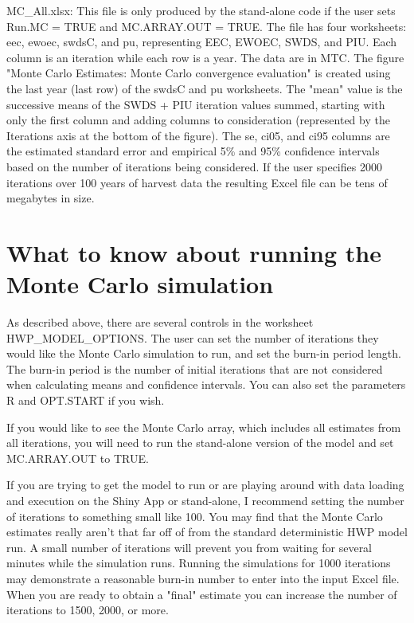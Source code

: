 \documentclass[
]{book}
\begin{document}
MC\_All.xlsx: This file is only produced by the stand-alone code if the user sets Run.MC = TRUE and MC.ARRAY.OUT = TRUE. The file has four worksheets: eec, ewoec, swdsC, and pu, representing EEC, EWOEC, SWDS, and PIU. Each column is an iteration while each row is a year. The data are in MTC. The figure "Monte Carlo Estimates: Monte Carlo convergence evaluation" is created using the last year (last row) of the swdsC and pu worksheets. The "mean" value is the successive means of the SWDS + PIU iteration values summed, starting with only the first column and adding columns to consideration (represented by the Iterations axis at the bottom of the figure). The se, ci05, and ci95 columns are the estimated standard error and empirical 5\% and 95\% confidence intervals based on the number of iterations being considered. If the user specifies 2000 iterations over 100 years of harvest data the resulting Excel file can be tens of megabytes in size.

\hypertarget{own-mc}{%
\section{What to know about running the Monte Carlo simulation}\label{own-mc}}

As described above, there are several controls in the worksheet HWP\_MODEL\_OPTIONS. The user can set the number of iterations they would like the Monte Carlo simulation to run, and set the burn-in period length. The burn-in period is the number of initial iterations that are not considered when calculating means and confidence intervals. You can also set the parameters R and OPT.START if you wish.

If you would like to see the Monte Carlo array, which includes all estimates from all iterations, you will need to run the stand-alone version of the model and set MC.ARRAY.OUT to TRUE.

If you are trying to get the model to run or are playing around with data loading and execution on the Shiny App or stand-alone, I recommend setting the number of iterations to something small like 100. You may find that the Monte Carlo estimates really aren't that far off of from the standard deterministic HWP model run. A small number of iterations will prevent you from waiting for several minutes while the simulation runs. Running the simulations for 1000 iterations may demonstrate a reasonable burn-in number to enter into the input Excel file. When you are ready to obtain a "final" estimate you can increase the number of iterations to 1500, 2000, or more.
\end{document}
